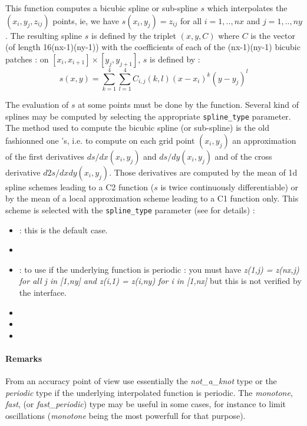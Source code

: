 \begin{mandescription}
    This function computes a bicubic spline or sub-spline $s$ which interpolates the 
    $(x_i,y_j,z_{ij})$ points, ie, we have $s(x_i,y_j)=z_{ij}$ for all  $i=1,..,nx$
    and $j=1,..,ny$. 
    The resulting spline $s$ is defined by the triplet $(x,y,C)$ where
    $C$ is the vector (of length 16(nx-1)(ny-1)) with the coefficients of each
    of the (nx-1)(ny-1) bicubic patches : on $[x_i, x_{i+1}] \times
    [y_j, y_{j+1}]$, $s$ is defined by :
    $$
       s(x,y) = \sum_{k=1}^4  \sum_{l=1}^4  C_{i,j}(k,l) (x - x_i)^k
       (y - y_j)^l
    $$

    The evaluation of  $s$ at some points must be done by the   
    function. Several kind of splines may be computed by selecting the appropriate 
    \verb!spline_type! parameter. The method used to compute the bicubic spline
    (or sub-spline) is the old fashionned one 's, i.e. to compute on each grid point
    $(x_i,y_j)$ an approximation of the first derivatives $ds/dx(x_i,y_j)$
    and $ds/dy(x_i,y_j)$ and of the cross derivative $d2s/dxdy(x_i,y_j)$.
    Those derivatives are computed by the mean of 1d spline schemes leading to a C2
    function ($s$ is twice continuously differentiable) or by the mean of a
    local approximation scheme leading to a C1 function only. This scheme is selected
    with the \verb!spline_type! parameter (see   for details) :  
    
  \begin{itemize}

       \item {} : this is the default case.
       \item {} 
       \item {} : to use if the underlying function is periodic : you must have {\em z(1,j) = z(nx,j) for
              all j in [1,ny] and  z(i,1) = z(i,ny) for i in [1,nx]} but this is not verified
              by the interface.
       \item {} 
       \item {} 
       \item {}  
  \end{itemize}

  \end{mandescription}


  \paragraph{Remarks}
From an accuracy point of view use essentially the {\em not\_a\_knot} type or 
the {\em periodic} type if the underlying interpolated function is periodic.
The {\em monotone}, {\em fast},  (or {\em fast\_periodic}) type may
be useful in some cases, for instance to limit oscillations ({\em monotone} being the
most powerfull for that purpose).
    

